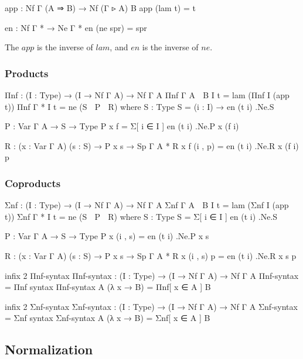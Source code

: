 \begin{code}
app : Nf Γ (A ⇒ B) → Nf (Γ ▹ A) B
app (lam t) = t

en : Nf Γ * → Ne Γ *
en (ne spr) = spr
\end{code}

The $app$ is the inverse of $lam$, and $en$ is the inverse of $ne$.

\subsubsection*{Products}

\begin{code}
Πnf : (I : Type) → (I → Nf Γ A) → Nf Γ A
Πnf {Γ} {A ⇒ B} I t⃗ = lam (Πnf I (app ∘ t⃗))
Πnf {Γ} {*} I t⃗ = ne (S ◃ P ◃ R)
  where
  S : Type
  S = (i : I) → en (t⃗ i) .Ne.S

  P : Var Γ A → S → Type
  P x f = Σ[ i ∈ I ] en (t⃗ i) .Ne.P x (f i)

  R : (x : Var Γ A) (s : S) → P x s → Sp Γ A *
  R x f (i , p) = en (t⃗ i) .Ne.R x (f i) p
\end{code}

\subsubsection*{Coproducts}

\begin{code}
Σnf : (I : Type) → (I → Nf Γ A) → Nf Γ A
Σnf {Γ} {A ⇒ B} I t⃗ = lam (Σnf I (app ∘ t⃗))
Σnf {Γ} {*} I t⃗ = ne (S ◃ P ◃ R)
  where
  S : Type
  S = Σ[ i ∈ I ] en (t⃗ i) .Ne.S

  P : Var Γ A → S → Type
  P x (i , s) = en (t⃗ i) .Ne.P x s

  R : (x : Var Γ A) (s : S) → P x s → Sp Γ A *
  R x (i , s) p = en (t⃗ i) .Ne.R x s p
\end{code}

\begin{code}[hide]
infix 2 Πnf-syntax
Πnf-syntax : (I : Type) → (I → Nf Γ A) → Nf Γ A
Πnf-syntax = Πnf
syntax Πnf-syntax A (λ x → B) = Πnf[ x ∈ A ] B

infix 2 Σnf-syntax
Σnf-syntax : (I : Type) → (I → Nf Γ A) → Nf Γ A
Σnf-syntax = Σnf
syntax Σnf-syntax A (λ x → B) = Σnf[ x ∈ A ] B
\end{code}

\subsection{Normalization}

